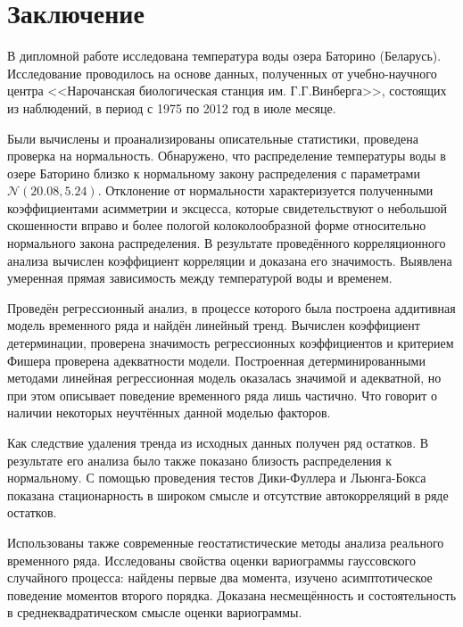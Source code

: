
\chapter*{Заключение}

В дипломной работе исследована температура воды озера Баторино (Беларусь). Исследование проводилось на основе данных, полученных от учебно-научного центра <<Нарочанская биологическая станция им. Г.Г.Винберга>>, состоящих из наблюдений, в период с 1975 по 2012 год в июле месяце.

Были вычислены и проанализированы описательные статистики, проведена проверка на нормальность. Обнаружено, что распределение температуры воды в озере Баторино близко к нормальному закону распределения с параметрами $ \mathcal{N}(20.08, 5.24) $. Отклонение от нормальности характеризуется полученными коэффициентами асимметрии и эксцесса, которые свидетельствуют о небольшой скошенности вправо и более пологой колоколообразной форме относительно нормального закона распределения. В результате проведённого корреляционного анализа вычислен коэффициент корреляции и доказана его значимость. Выявлена умеренная прямая зависимость между температурой воды и временем.

Проведён регрессионный анализ, в процессе которого была построена аддитивная модель временного ряда и найдён линейный тренд. Вычислен коэффициент детерминации, проверена значимость регрессионных коэффициентов и критерием Фишера проверена адекватности модели. Построенная детерминированными методами линейная регрессионная модель оказалась значимой и адекватной, но при этом описывает поведение временного ряда лишь частично. Что говорит о наличии некоторых неучтённых данной моделью факторов.

Как следствие удаления тренда из исходных данных получен ряд остатков. В результате его анализа было также показано близость распределения к нормальному. С помощью проведения тестов Дики-Фуллера и Льюнга-Бокса показана стационарность в широком смысле и отсутствие автокорреляций в ряде остатков.

Использованы также современные геостатистические методы анализа реального временного ряда. Исследованы свойства оценки вариограммы гауссовского случайного процесса: найдены первые два момента, изучено асимптотическое поведение моментов второго порядка. Доказана несмещённость и состоятельность в среднеквадратическом смысле оценки вариограммы.

